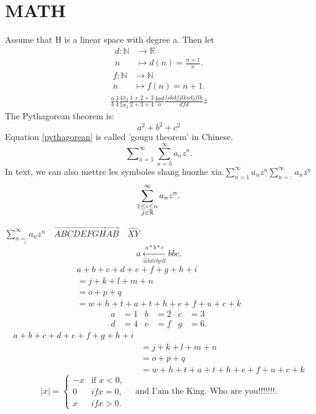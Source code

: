\documentclass{ctexart}
\begin{document}
\section{MATH}
Assume that H is a linear space with degree a. Then let \begin{align*}
	d: \mathbb{N} &\longrightarrow \mathbb{R} \\
	 n&\longmapsto d(n) = \frac{n+1}{n} 
.\end{align*}
\begin{align*}
	f: \mathbb{N} &\longrightarrow \mathbb{N} \\
	n &\longmapsto f(n) = n+1
.\end{align*}
\begin{align}
	\frac{a}{b}
	\frac{3}{4}
	\frac{4\pi_2}{5\pi_2}
	\frac{1+2+3}{2+3+4}
	\frac{4ad}{o}
	\frac{lskdfjlksdjflk}{dfd}	
	\overline{z}
\end{align}
The Pythagorean theorem is:
\begin{equation}
	a^{2}+b^{2}+c^{2} \label{pythagorean} %
\end{equation}
Equation \eqref{pythagorean} is called 'gougu theorem' in Chinese.
\[
\sum\nolimits_{n=1}^{\infty} \sum_{n=h}^{\infty} a_n z^n
.\] 
In text, we can also mettre les symboles shang huozhe xia.$\sum\limits_{n=1}^{\infty} a_n z^n \sum_{n=:}^{\infty} a_n z^n$
\[
\sum_{
\begin{subarray}{c}
	1 \le i \le n\\
	j \in \mathbb{R}
\end{subarray}
}^{\infty} a_n z^n
.\] 

$\underline{\underline{\sum_{n=}^{\infty} a_n z^n}}\quad \overrightarrow{ABCDEFGH} \overrightarrow{AB}\quad \widehat{XY}$
\[
a\xleftarrow[\hat{w} hte hell]{a*b*c}bbc
.\] 
\[
.\] 
\begin{multline}
	a+b+c+d+e+f+g+h+i\\
	= j+k+l+m+n\\
	= o+p+q\\
	= w +h +t+a+t+h+e+f+u+c+k
\end{multline}
\begin{align*}
	a &= 1 & b &= 2 & c &= 3\\
	d &= 4 & e &= f & g &= 6
.\end{align*}
\begin{equation}
\begin{aligned}
	a+b+c+d+e+f+g+h+i\\
	&= j+k+l+m+n\\
	&= o+p+q\\
	&= w +h +t+a+t+h+e+f+u+c+k
\end{aligned}
\end{equation}
\[
|x|=
\begin{cases}
	-x & \text{if } x < 0,\\
	0 & if x = 0,\\
	x & if x > 0.
\end{cases}
\quad\text{and I'am the King. Who are you!!!!!!!}
.\] 
\end{document}

